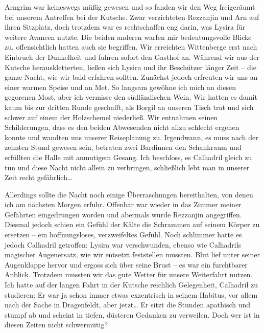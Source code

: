 Arngrim war keineswegs müßig gewesen und so fanden wir den Weg freigeräumt bei unserem Antreffen bei der Kutsche. Zwar verzichteten Rezzanjin und Arn auf ihren Sitzplatz, doch trotzdem war es rechtschaffen eng darin, was Lysira für weitere Avancen nutzte. Die beiden anderen warfen mir bedeutungsvolle Blicke zu, offensichtlich hatten auch sie begriffen. Wir erreichten Wittenberge erst nach Einbruch der Dunkelheit und fuhren sofort den Gasthof an. Während wir aus der Kutsche herauskletterten, ließen sich Lysira und ihr Beschützer länger Zeit -- die ganze Nacht, wie wir bald erfahren sollten. Zunächst jedoch erfreuten wir uns an einer warmen Speise und an Met. So langsam gewöhne ich mich an diesen gegorenen Most, aber ich vermisse den südländischen Wein. Wir hatten es damit kaum bis zur dritten Runde geschafft, als Borgil an unseren Tisch trat und sich schwer auf einem der Holzschemel niederließ. Wir entnahmen seinen Schilderungen, dass es den beiden Abwesenden nicht allzu schlecht ergehen konnte und wandten uns unserer Reiseplanung zu. Irgendwann, es muss nach der zehnten Stund gewesen sein, betraten zwei Bardinnen den Schankraum und erfüllten die Halle mit anmutigem Gesang. Ich beschloss, es Calhadril gleich zu tun und diese Nacht nicht allein zu verbringen, schließlich lebt man in unserer Zeit recht gefährlich…\par

Allerdings sollte die Nacht noch einige Überraschungen bereithalten, von denen ich am nächsten Morgen erfuhr. Offenbar war wieder in das Zimmer meiner Gefährten eingedrungen worden und abermals wurde Rezzanjin angegriffen. Diesmal jedoch schien ein Gefühl der Kälte die Schrammen auf seinem Körper zu ersetzen -- ein hoffnungsloses, verzweifeltes Gefühl. Noch schlimmer hatte es jedoch Calhadril getroffen: Lysira war verschwunden, ebenso wie Calhadrils magischer Augenersatz, wie wir entsetzt feststellen mussten. Blut lief unter seiner Augenklappe hervor und ergoss sich über seine Brust -- es war ein furchtbarer Anblick. Trotzdem mussten wir das gute Wetter für unsere Weiterfahrt nutzen. Ich hatte auf der langen Fahrt in der Kutsche reichlich Gelegenheit, Calhadril zu studieren: Er war ja schon immer etwas exzentrisch in seinem Habitus, vor allem nach der Sache in Dragenfeldt, aber jetzt… Er sitzt die Stunden apathisch und stumpf ab und scheint in tiefen, düsteren Gedanken zu verweilen. Doch wer ist in diesen Zeiten nicht schwermütig?\par

